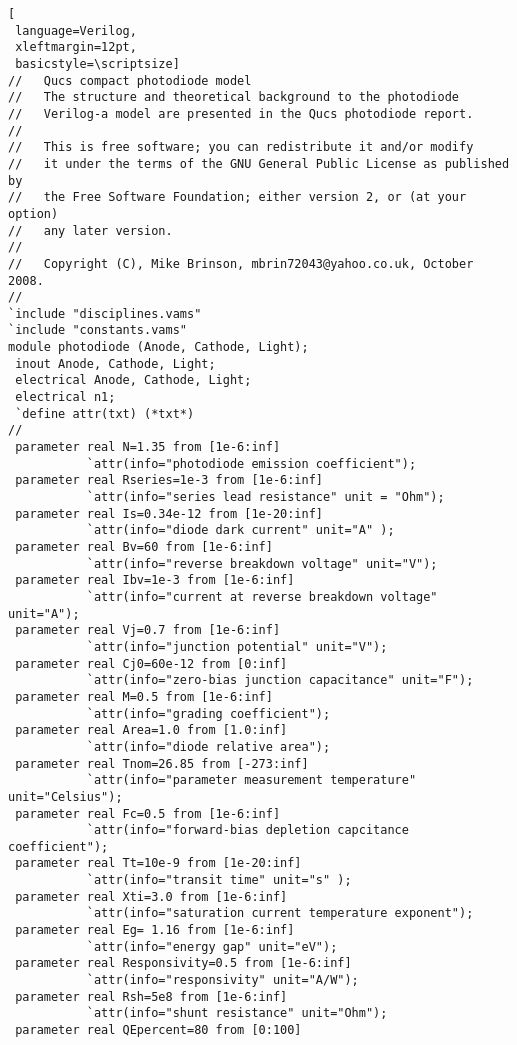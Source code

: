 \begin{lstlisting}[
 language=Verilog, 
 xleftmargin=12pt,
 basicstyle=\scriptsize]
//   Qucs compact photodiode model
//   The structure and theoretical background to the photodiode
//   Verilog-a model are presented in the Qucs photodiode report.
//
//   This is free software; you can redistribute it and/or modify
//   it under the terms of the GNU General Public License as published by
//   the Free Software Foundation; either version 2, or (at your option)
//   any later version.
// 
//   Copyright (C), Mike Brinson, mbrin72043@yahoo.co.uk, October 2008.
//
`include "disciplines.vams"
`include "constants.vams"
module photodiode (Anode, Cathode, Light); 
 inout Anode, Cathode, Light;
 electrical Anode, Cathode, Light;
 electrical n1;
 `define attr(txt) (*txt*)
//
 parameter real N=1.35 from [1e-6:inf]           
           `attr(info="photodiode emission coefficient");
 parameter real Rseries=1e-3 from [1e-6:inf]      
           `attr(info="series lead resistance" unit = "Ohm");
 parameter real Is=0.34e-12 from [1e-20:inf]      
           `attr(info="diode dark current" unit="A" );
 parameter real Bv=60 from [1e-6:inf]             
           `attr(info="reverse breakdown voltage" unit="V");
 parameter real Ibv=1e-3 from [1e-6:inf]          
           `attr(info="current at reverse breakdown voltage" unit="A");
 parameter real Vj=0.7 from [1e-6:inf]            
           `attr(info="junction potential" unit="V");
 parameter real Cj0=60e-12 from [0:inf]           
           `attr(info="zero-bias junction capacitance" unit="F");
 parameter real M=0.5 from [1e-6:inf]             
           `attr(info="grading coefficient");
 parameter real Area=1.0 from [1.0:inf]           
           `attr(info="diode relative area");
 parameter real Tnom=26.85 from [-273:inf]        
           `attr(info="parameter measurement temperature" unit="Celsius");
 parameter real Fc=0.5 from [1e-6:inf]            
           `attr(info="forward-bias depletion capcitance coefficient");
 parameter real Tt=10e-9 from [1e-20:inf]         
           `attr(info="transit time" unit="s" );
 parameter real Xti=3.0 from [1e-6:inf]           
           `attr(info="saturation current temperature exponent");
 parameter real Eg= 1.16 from [1e-6:inf]          
           `attr(info="energy gap" unit="eV");
 parameter real Responsivity=0.5 from [1e-6:inf]  
           `attr(info="responsivity" unit="A/W");
 parameter real Rsh=5e8 from [1e-6:inf]           
           `attr(info="shunt resistance" unit="Ohm");
 parameter real QEpercent=80 from [0:100]         

\end{lstlisting}
